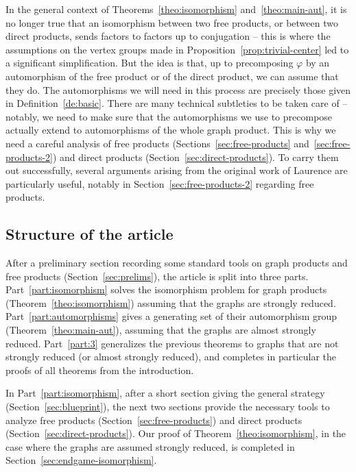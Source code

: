 \documentclass[a4paper,english,11pt]{article}
\theoremstyle{definition}
\theoremstyle{remark}
\begin{document}
In the general context of Theorems~\ref{theo:isomorphism} and~\ref{theo:main-aut}, it is no longer true that an isomorphism between two free products, or between two direct products, sends factors to factors up to conjugation -- this is where the assumptions on the vertex groups made in Proposition~\ref{prop:trivial-center} led to a significant simplification. But the idea is that, up to precomposing $\varphi$ by an automorphism of the free product or of the direct product, we can assume that they do. The automorphisms we will need in this process are precisely those given in Definition~\ref{de:basic}. There are many technical subtleties to be taken care of -- notably, we need to make sure that the automorphisms we use to precompose actually extend to automorphisms of the whole graph product. This is why we need a careful analysis of free products (Sections~\ref{sec:free-products} and~\ref{sec:free-products-2}) and direct products (Section~\ref{sec:direct-products}). To carry them out successfully, several arguments
arising from the original work of Laurence \cite{Lau} are particularly useful, notably in Section~\ref{sec:free-products-2} regarding free products.

\subsection{Structure of the article}
After a preliminary section recording some standard tools on graph products and free products (Section~\ref{sec:prelims}), the article is split into three parts. Part~\ref{part:isomorphism} solves the isomorphism problem for graph products (Theorem~\ref{theo:isomorphism}) assuming that the graphs are strongly reduced. Part~\ref{part:automorphisms} gives a generating set of their automorphism group (Theorem~\ref{theo:main-aut}), assuming that the graphs are almost strongly reduced. Part~\ref{part:3} generalizes the previous theorems to graphs that are not strongly reduced (or almost strongly reduced), and completes in particular the proofs of all theorems from the introduction.

In Part~\ref{part:isomorphism}, after a short section giving the general strategy (Section~\ref{sec:blueprint}), the next two sections provide the necessary tools to analyze free products (Section~\ref{sec:free-products}) and direct products (Section~\ref{sec:direct-products}). Our proof of Theorem~\ref{theo:isomorphism}, in the case where the graphs are assumed strongly reduced, is completed in Section~\ref{sec:endgame-isomorphism}.
\end{document}
